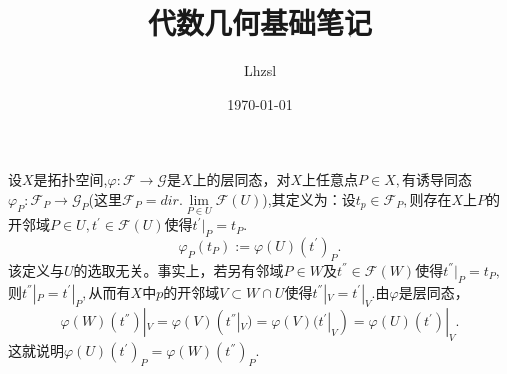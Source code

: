 \documentclass[UTF8]{article}
\title{代数几何基础笔记}
\author{Lhzsl}
\date{\today }
\begin{document}
	\maketitle
	设$X$是拓扑空间,$\varphi:\mathcal{F}\rightarrow\mathcal{G}$是$X$上的层同态，对$X$上任意点$P\in X,$有诱导同态$\varphi_{P}:\mathcal{F}_{P}\rightarrow\mathcal{G}_{P}$(这里$\mathcal{F}_{P}=dir.\lim\limits_{P\in U}\mathcal{F}(U)$),其定义为：设$t_{p}\in \mathcal{F}_{P},$则存在$X$上$P$的开邻域$P\in U,t^{'}\in \mathcal{F}(U)$使得$t^{'}|_{P}=t_{P}.$
	$$
	\varphi_{P}(t_{P}):=\varphi(U)(t^{'})_{P}.
	$$
	该定义与$U$的选取无关。事实上，若另有邻域$P\in W$及$t^{''}\in \mathcal{F}(W)$使得$t^{''}|_P=t_{P},$则$t^{''}|_{P}=t^{'}|_{P},$从而有$X$中$p$的开邻域$V\subset W\cap U$使得$t^{''}|_{V}=t^{'}|_{V}$.由$\varphi$是层同态，$$
	\varphi(W)(t^{''})|_{V}=\varphi(V)(t^{''}|_{V})=\varphi(V)(t^{'}|_{V})=\varphi(U)(t^{'})|_{V}.
	$$
	这就说明$\varphi(U)(t^{'})_{P}=\varphi(W)(t^{''})_{P}$.\\
	
\end{document}
